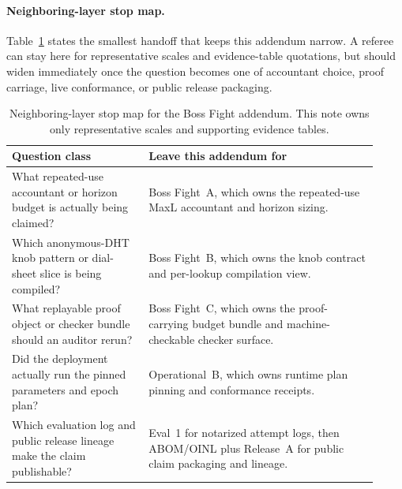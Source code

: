 \documentclass[11pt]{article}
\begin{document}
\paragraph{Neighboring-layer stop map.}
Table~\ref{tab:bossfight-addendum-stopmap} states the smallest handoff that keeps this addendum narrow.
A referee can stay here for representative scales and evidence-table quotations, but should widen immediately once the question becomes one of accountant choice, proof carriage, live conformance, or public release packaging.

\begin{table}[H]
\centering
\begin{tabular}{@{}p{0.34\linewidth}p{0.58\linewidth}@{}}
\toprule
Question class & Leave this addendum for \\
\midrule
What repeated-use accountant or horizon budget is actually being claimed? & Boss Fight~A, which owns the repeated-use MaxL accountant and horizon sizing. \\
Which anonymous-DHT knob pattern or dial-sheet slice is being compiled? & Boss Fight~B, which owns the knob contract and per-lookup compilation view. \\
What replayable proof object or checker bundle should an auditor rerun? & Boss Fight~C, which owns the proof-carrying budget bundle and machine-checkable checker surface. \\
Did the deployment actually run the pinned parameters and epoch plan? & Operational~B, which owns runtime plan pinning and conformance receipts. \\
Which evaluation log and public release lineage make the claim publishable? & Eval~1 for notarized attempt logs, then ABOM/OINL plus Release~A for public claim packaging and lineage. \\
\bottomrule
\end{tabular}
\caption{Neighboring-layer stop map for the Boss Fight addendum. This note owns only representative scales and supporting evidence tables.}
\label{tab:bossfight-addendum-stopmap}
\end{table}
\end{document}

